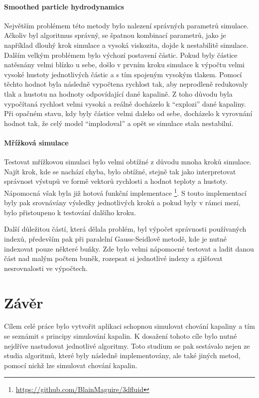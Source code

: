 \subsubsection{Smoothed particle hydrodynamics}
Největším problémem této metody bylo nalezení správných parametrů simulace. Ačkoliv byl algoritmus správný, se špatnou kombinací parametrů, jako je například dlouhý krok simulace a vysoká viskozita, dojde k nestabilitě simulace. Dalším velkým problémem bylo výchozí postavení částic. Pokud byly částice natěsnány velmi blízko u sebe, došlo v prvním kroku simulace k výpočtu velmi vysoké hustoty jednotlivých částic a s tím spojeným vysokým tlakem. Pomocí těchto hodnot byla následně vypočtena rychlost tak, aby neprodleně redukovaly tlak a hustotu na hodnoty odpovídající dané kapalině. Z toho důvodu byla vypočítaná rychlost velmi vysoká a reálně docházelo k \enquote{explozi} dané kapaliny. Při opačném stavu, kdy byly částice velmi daleko od sebe, docházelo k vyrovnání hodnot tak, že celý model \enquote{implodoval} a opět se simulace stala nestabilní.

\subsubsection{Mřížková simulace}
Testovat mřížkovou simulaci bylo velmi obtížné z důvodu mnoha kroků simulace. Najít krok, kde se nachází chyba, bylo obtížné, stejně tak jako interpretovat správnost výstupů ve formě vektorů rychlosti a hodnot teploty a hustoty. Nápomocná však byla již hotová funkční implementace \footnote{\url{https://github.com/BlainMaguire/3dfluid}}. S touto implementací byly pak srovnávány výsledky jednotlivých kroků a pokud byly v rámci mezí, bylo přistoupeno k testování dalšího kroku.

Další důležitou částí, která dělala problém, byl výpočet správnosti používaných indexů, především pak při paralelní Gauss-Seidlově metodě, kde je nutné indexovat pouze některé buňky. Zde bylo velmi nápomocné testovat a ladit danou část nad malým počtem buněk, rozepsat si jednotlivé indexy a zjišťovat nesrovnalosti ve výpočtech.


\chapter{Závěr}
\label{chapter:zaver}

Cílem celé práce bylo vytvořit aplikaci schopnou simulovat chování kapaliny a tím se seznámit s principy simulování kapalin. K dosažení tohoto cíle bylo nutné nejdříve nastudovat jednotlivé algoritmy. Toto studium se pak sestávalo nejen ze studia algoritmů, které byly následně implementovány, ale také jiných metod, pomocí nichž lze simulovat chování kapalin.

